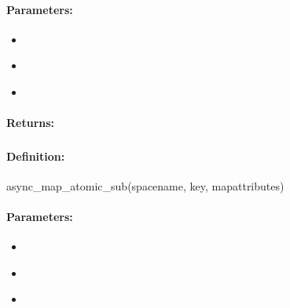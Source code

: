\paragraph{Parameters:}
\begin{itemize}[noitemsep]
\item {}\\

\item {}\\

\item {}\\

\end{itemize}

\paragraph{Returns:}


\pagebreak
\subsubsection{}
\label{api:ruby:async_map_atomic_sub}


\paragraph{Definition:}
\begin{rubycode}
async_map_atomic_sub(spacename, key, mapattributes)
\end{rubycode}

\paragraph{Parameters:}
\begin{itemize}[noitemsep]
\item {}\\

\item {}\\

\item {}\\

\end{itemize}

